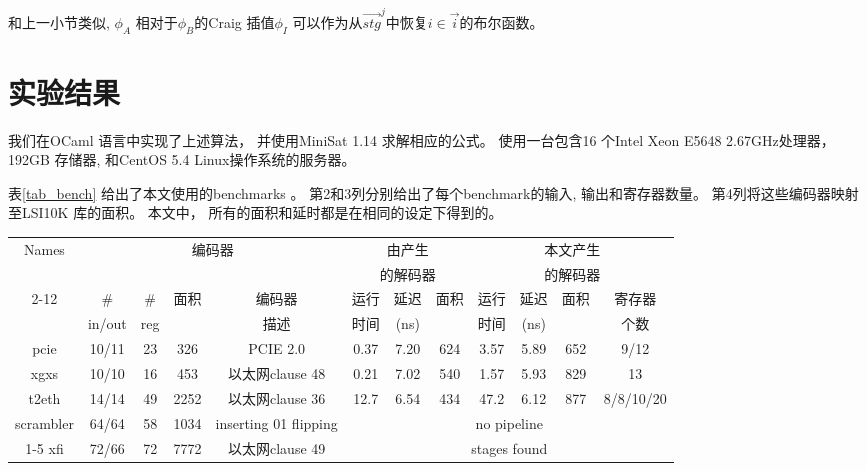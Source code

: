 和上一小节类似,
$\phi_A$ 相对于$\phi_B$的Craig 插值$\phi_I$ 
可以作为从$\vec{stg}^j$中恢复$i\in\vec{i}$的布尔函数。



\section{实验结果}\label{sec_exp}
我们在OCaml 语言中实现了上述算法，
并使用MiniSat 1.14 \cite{EXTSAT}求解相应的公式。
使用一台包含16 个Intel Xeon E5648 2.67GHz处理器，
192GB 存储器, 和CentOS 5.4 Linux操作系统的服务器。

表\ref{tab_bench} 给出了本文使用的benchmarks 。
第2和3列分别给出了每个benchmark的输入, 输出和寄存器数量。
第4列将这些编码器映射至LSI10K 库的面积。
本文中，
所有的面积和延时都是在相同的设定下得到的。



\begin{table*}[t]
\caption{Benchmarks and experimental results}
\begin{tabular}{|c|c|c|c|c|c|c|c|c|c|c|c|}
\hline
 Names     & \multicolumn{4}{|c|}{编码器}                                  &   \multicolumn{3}{|c|}{由\cite{ShenTCAD11}产生}             &   \multicolumn{4}{|c|}{本文产生} \\
           & \multicolumn{4}{|c|}{}                                              &   \multicolumn{3}{|c|}{的解码器}  &   \multicolumn{4}{|c|}{的解码器} \\\cline{2-12}
           &    \#   &   \#    &面积& 编码器&运行&延迟&面积                                       &运行&延迟&面积&寄存器\\
           & in/out  &  reg    &      &   描述&时间&(ns) &                                        &时间 &(ns) &    &个数\\\hline\hline
 pcie      & 10/11   & 23      & 326  &PCIE 2.0 \cite{pcie21}                    &0.37 &7.20 &624                                     &3.57 & 5.89&652 &9/12\\\hline
 xgxs      & 10/10   & 16      & 453  &     以太网clause 48 \cite{IEEE8023_S4}&0.21 &7.02 &540                                     &1.57 & 5.93&829 &13\\\hline
 t2eth     & 14/14   & 49      & 2252 &    以太网clause 36 \cite{IEEE8023_S4} &12.7 &6.54 &434                                     &47.2 & 6.12&877 &8/8/10/20\\\hline
scrambler  &64/64    & 58      & 1034 & inserting 01 flipping                    &     \multicolumn{7}{|c|}{no pipeline }\\\cline{1-5}
 xfi       & 72/66   & 72      & 7772 &     以太网clause 49 \cite{IEEE8023_S4}&     \multicolumn{7}{|c|}{stages found}\\\hline
\end{tabular}\label{tab_bench}
\end{table*}





